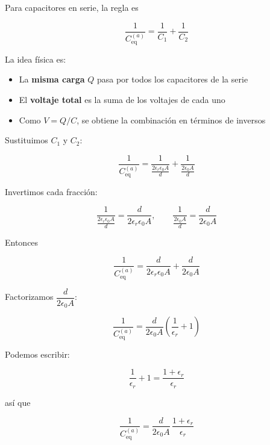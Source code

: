 \documentclass{article}
\begin{document}
Para capacitores en serie, la regla es

\begin{equation}
\frac{1}{C_{\text{eq}}^{(a)}} = \frac{1}{C_{1}} + \frac{1}{C_{2}}
\label{eq:serie-regla}
\end{equation}

La idea física es:
\begin{itemize}
  \item La \textbf{misma carga} $Q$ pasa por todos los capacitores de la serie
  \item El \textbf{voltaje total} es la suma de los voltajes de cada uno
  \item Como $V = Q/C$, se obtiene la combinación en términos de inversos
\end{itemize}

Sustituimos $C_{1}$ y $C_{2}$:

\begin{equation}
\frac{1}{C_{\text{eq}}^{(a)}} 
= \frac{1}{\frac{2\epsilon_{r}\epsilon_{0}A}{d}}
 + \frac{1}{\frac{2\epsilon_{0}A}{d}}
\label{eq:1Ceq-a-paso1}
\end{equation}

Invertimos cada fracción:

\[
\frac{1}{\frac{2\epsilon_{r}\epsilon_{0}A}{d}} = \frac{d}{2\epsilon_{r}\epsilon_{0}A},
\qquad
\frac{1}{\frac{2\epsilon_{0}A}{d}} = \frac{d}{2\epsilon_{0}A}
\]

Entonces

\begin{equation}
\frac{1}{C_{\text{eq}}^{(a)}} 
= \frac{d}{2\epsilon_{r}\epsilon_{0}A}
 + \frac{d}{2\epsilon_{0}A}
\label{eq:1Ceq-a-paso2}
\end{equation}

Factorizamos $\dfrac{d}{2\epsilon_{0}A}$:

\begin{equation}
\frac{1}{C_{\text{eq}}^{(a)}} 
= \frac{d}{2\epsilon_{0}A}
 \left(\frac{1}{\epsilon_{r}} + 1\right)
\label{eq:1Ceq-a-paso3}
\end{equation}

Podemos escribir:

\[
\frac{1}{\epsilon_{r}} + 1 = \frac{1+\epsilon_{r}}{\epsilon_{r}}
\]

así que

\begin{equation}
\frac{1}{C_{\text{eq}}^{(a)}} 
= \frac{d}{2\epsilon_{0}A}\,\frac{1+\epsilon_{r}}{\epsilon_{r}}
\label{eq:serie-a}
\end{equation}
\end{document}
